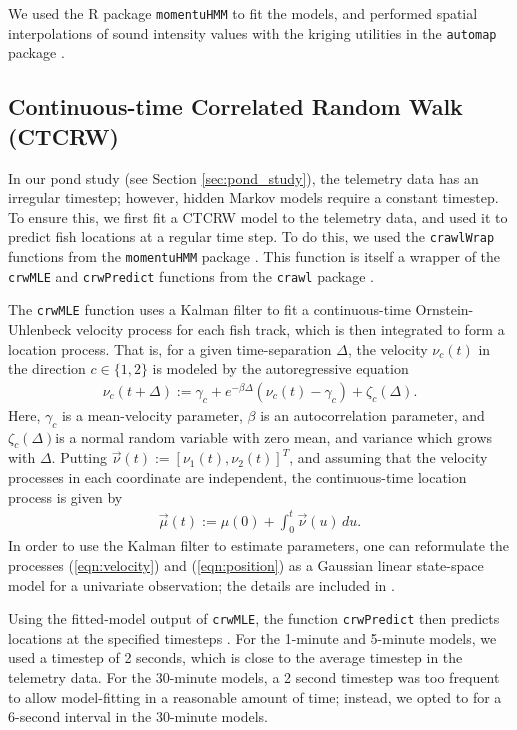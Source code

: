 \documentclass[12pt]{article}
\begin{document}
	 We used the R package \texttt{momentuHMM} \cite{McClintock2018} to fit the models, and performed spatial interpolations of sound intensity values with the kriging utilities in the \texttt{automap} package  \cite{Hiemstra2008}.

	\subsection{Continuous-time Correlated Random Walk (CTCRW)}
	
		In our pond study (see Section \ref{sec:pond_study}), the telemetry data has an irregular timestep; however, hidden Markov models require a constant timestep. To ensure this, we first fit a CTCRW model to the telemetry data, and used it to predict fish locations at a regular time step. To do this, we used the \texttt{crawlWrap} functions from the \texttt{momentuHMM} package \cite{McClintock2018}. This function is itself a wrapper of the \texttt{crwMLE} and \texttt{crwPredict} functions from the \texttt{crawl} package \cite{crawl}.
		
		The \texttt{crwMLE} function uses a Kalman filter to fit a continuous-time Ornstein-Uhlenbeck velocity process for each fish track, which is then integrated to form a location process. That is, for a given time-separation $\Delta$, the velocity $\nu_c(t)$ in the direction $c \in \{1, 2\}$ is modeled by the autoregressive equation
		\begin{align}
			\nu_c(t + \Delta) := \gamma_c + e^{-\beta \Delta} (\nu_c(t) - \gamma_c) + \zeta_c(\Delta). \label{eqn:velocity}
		\end{align}
		Here, $\gamma_c$ is a mean-velocity parameter, $\beta$ is an autocorrelation parameter, and $\zeta_c(\Delta)$is a normal random variable with zero mean, and variance which grows with $\Delta$. Putting $\vec \nu(t) := [\nu_1(t), \nu_2(t)]^T$, and assuming that the velocity processes in each coordinate are independent, the continuous-time location process is given by
		\begin{align}
			\vec \mu(t) := \mu(0) + \int_0^t \vec \nu(u) \, du. \label{eqn:position}
		\end{align}
		In order to use the Kalman filter to estimate parameters, one can reformulate the processes (\ref{eqn:velocity}) and (\ref{eqn:position}) as a Gaussian linear state-space model for a univariate observation; the details are included in \cite{Johnson2008}.
		
		Using the fitted-model output of \texttt{crwMLE}, the function \texttt{crwPredict} then predicts locations at the specified timesteps \cite{crawl, Johnson2008}. For the 1-minute and 5-minute models, we used a timestep of 2 seconds, which is close to the average timestep in the telemetry data. For the 30-minute models, a 2 second timestep was too frequent to allow model-fitting in a reasonable amount of time; instead, we opted to for a 6-second interval in the 30-minute models.
\end{document}

